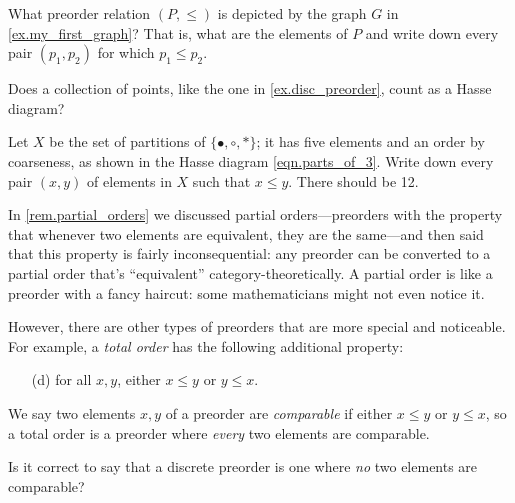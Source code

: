 \documentclass[7Sketches]{subfiles}
\begin{document}
\begin{exercise}%
\label{exc.graph_to_hasse}
	What preorder relation $(P,\leq)$ is depicted by the graph $G$ in \cref{ex.my_first_graph}? That is, what are the elements of $P$ and write down every pair $(p_1,p_2)$ for which $p_1\leq p_2$.
\end{exercise}

\begin{exercise}%
\label{exc.points_as_hasse}
Does a collection of points, like the one in \cref{ex.disc_preorder}, count as a Hasse diagram? 
\end{exercise}

\begin{exercise}%
\label{exc.order_parts_practice}
Let $X$ be the set of partitions of $\{\bullet,\circ,\ast\}$; it has five elements and an order by coarseness, as shown in the Hasse diagram \cref{eqn.parts_of_3}. Write down every pair $(x,y)$ of elements in $X$ such that $x\leq y$. There should be 12.
\end{exercise}

\begin{remark}
In \cref{rem.partial_orders} we discussed partial orders---preorders with the property that whenever two elements are equivalent, they are the same---and then said that this property is fairly inconsequential: any preorder can be converted to a partial order that's ``equivalent'' category-theoretically. A partial order is like a preorder with a fancy haircut: some mathematicians might not even notice it.

However, there are other types of preorders that are more special and noticeable. For example, a \emph{total order} has the following additional property:
\begin{enumerate}
\item[(d)] for all $x,y$, either $x\leq y$ or $y\leq x$.  
\end{enumerate}
%
We say two elements $x,y$ of a preorder are \emph{comparable} if either $x\leq y$ or $y\leq x$, so a total order is a preorder where \emph{every} two elements are comparable.%
\end{remark}

\begin{exercise}%
\label{exc.discrete_preorder_comparable}
Is it correct to say that a discrete preorder is one where \emph{no} two elements are comparable?
\end{exercise}
\end{document}
